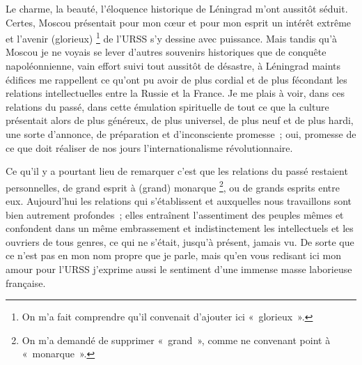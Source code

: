 \documentclass[twoside]{book} %
\begin{document}
\noindent Le charme, la beauté, l’éloquence historique de Léningrad m’ont aussitôt séduit. Certes, Moscou présentait pour mon cœur et pour mon esprit un intérêt extrême et l’avenir (glorieux) \footnote{On m’a fait comprendre qu’il convenait d’ajouter ici « glorieux ».} de l’URSS s’y dessine avec puissance. Mais tandis qu’à Moscou je ne voyais se lever d’autres souvenirs historiques que de conquête napoléonnienne, vain effort suivi tout aussitôt de désastre, à Léningrad maints édifices me rappellent ce qu’ont pu avoir de plus cordial et de plus fécondant les relations intellectuelles entre la Russie et la France. Je me plais à voir, dans ces relations du passé, dans cette émulation spirituelle de tout ce que la culture présentait alors de plus généreux, de plus universel, de plus neuf et de plus hardi, une sorte d’annonce, de préparation et d’inconsciente promesse ; oui, promesse de ce que doit réaliser de nos jours l’internationalisme révolutionnaire.\par
Ce qu’il y a pourtant lieu de remarquer c’est que les relations du passé restaient personnelles, de grand esprit à (grand) monarque \footnote{On m’a demandé de supprimer « grand », comme ne convenant point à « monarque ».}, ou de grands esprits entre eux. Aujourd’hui les relations qui s’établissent et auxquelles nous travaillons sont bien autrement profondes ; elles entraînent l’assentiment des peuples mêmes et confondent dans un même embrassement et indistinctement les intellectuels et les ouvriers de tous genres, ce qui ne s’était, jusqu’à présent, jamais vu. De sorte que ce n’est pas en mon nom propre que je parle, mais qu’en vous redisant ici mon amour pour l’URSS j’exprime aussi le sentiment d’une immense masse laborieuse française.\par
\end{document}

